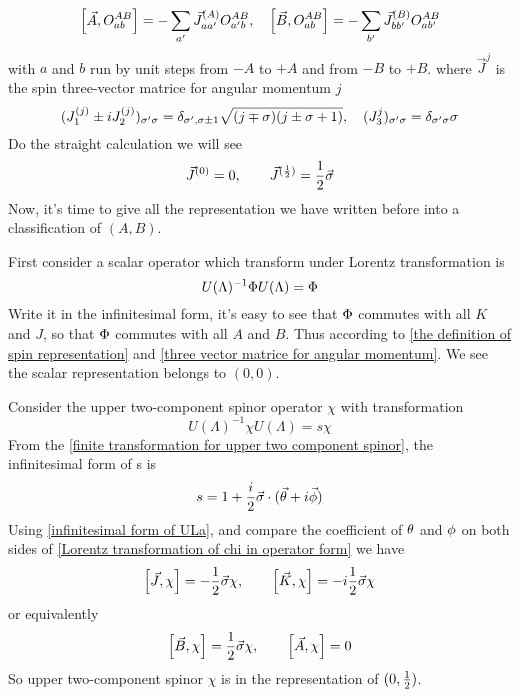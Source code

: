 \begin{equation} \label{the definition of spin representation}
\comm{\vec{A}}{O_{ab}^{AB}} = -\sum_{a'}\vec{J}^{(A)}_{aa'}O^{AB}_{a'b},\quad
\comm{\vec{B}}{O_{ab}^{AB}} = -\sum_{b'}\vec{J}^{(B)}_{bb'}O^{AB}_{ab'}
\end{equation}
with $a$ and $b$ run by unit steps from $-A$ to $+A$ and from $-B$ to $+B$. where $\vec{J}^{j}$ is the spin three-vector  matrice for angular momentum $j$
\begin{equation} \label{three vector matrice for angular momentum}
(J_1^{(j)}\pm i J_2^{(j)})_{\sigma'\sigma} = \delta_{\sigma',\sigma\pm 1}
\sqrt{(j\mp\sigma)(j\pm\sigma+1)},\quad
(J_3^{j})_{\sigma'\sigma} = \delta_{\sigma'\sigma} \sigma
\end{equation}
Do the straight calculation we will see
\begin{equation}
  \vec{J}^{(0)} = 0, \qquad
\vec{J}^{(\frac{1}{2})} = \frac{1}{2} \vec{\sigma}
\end{equation}
Now, it's time to give all the representation we have written before into a classification of $(A,B)$.

First consider a scalar operator which transform under Lorentz transformation is
\begin{equation}
  U(\Lambda)^{-1} \Phi U(\Lambda) = \Phi
\end{equation}
Write it in the infinitesimal form, it's easy to see that $\Phi$ commutes with all $K$ and $J$, so that  $\Phi$ commutes with all $A$ and $B$. Thus according to \eqref{the definition of spin representation} and \eqref{three vector matrice for angular momentum}. We see the scalar representation belongs to $(0,0)$.

Consider the upper two-component spinor operator $\chi$ with transformation
\begin{equation} \label{Lorentz transformation of chi in operator form}
U(\Lambda)^{-1}\chi U(\Lambda) = s \chi
\end{equation}
From the \eqref{finite transformation for upper two component spinor}, the infinitesimal form of s is
\begin{equation}
  s = 1 + \frac{i}{2} \vec{\sigma}\cdot(\vec{\theta}+i\vec{\phi})
\end{equation}
Using \eqref{infinitesimal form of ULa}, and compare the coefficient of $\theta$ and $\phi$ on both sides of \eqref{Lorentz transformation of chi in operator form} we have
\begin{equation}
  \comm{\vec{J}}{\chi} = -\half \vec{\s}\chi,\qquad
\comm{\vec{K}}{\chi} = - i\half \vec{\s}\chi
\end{equation}
or equivalently
\begin{equation}
  \comm{\vec{B}}{\chi} = \half \vec{\s}\chi,\qquad
\comm{\vec{A}}{\chi} =0
\end{equation}
So upper two-component spinor $\chi$ is in the representation of $(0,\frac{1}{2})$.

